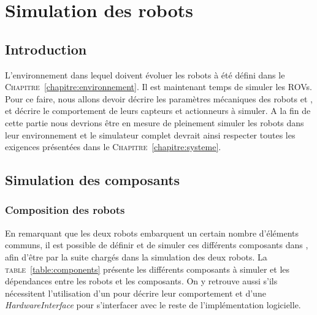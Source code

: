 \chapter{Simulation des robots}
\label{chapitre:robots}
	
	\section{Introduction}

		L'environnement dans lequel doivent évoluer les robots à été défini dans le \textsc{Chapitre}~\ref{chapitre:environnement}. Il est maintenant temps de simuler les \gls{ROV}s. Pour ce faire, nous allons devoir décrire les paramètres mécaniques des robots \argos{} et \atoll{}, et décrire le comportement de leurs capteurs et actionneurs à simuler. A la fin de cette partie nous devrions être en mesure de pleinement simuler les robots dans leur environnement et le simulateur complet devrait ainsi respecter toutes les exigences présentées dans le \textsc{Chapitre}~\ref{chapitre:systeme}.

	\section{Simulation des composants}

		\subsection{Composition des robots}
			En remarquant que les deux robots embarquent un certain nombre d'éléments communs, il est possible de définir et de simuler ces différents composants dans \gazebo, afin d'être par la suite chargés dans la simulation des deux robots. La \textsc{table}~\ref{table:components} présente les différents composants à simuler et les dépendances entre les robots et les composants. On y retrouve aussi s'ils nécessitent l'utilisation d'un \plugin{} \gazebo{} pour décrire leur comportement et d'une \textit{HardwareInterface} pour s'interfacer avec le reste de l'implémentation logicielle.

